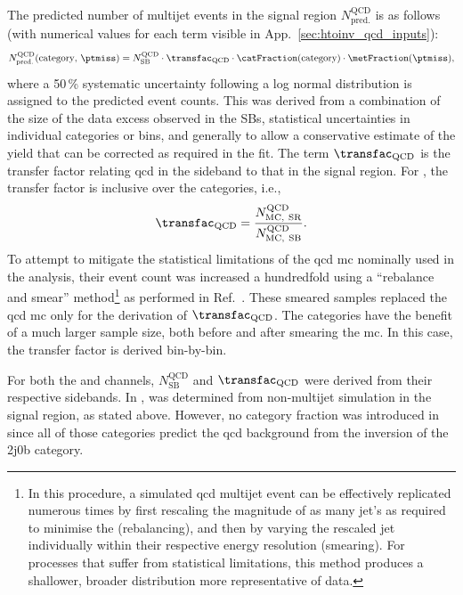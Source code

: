 The predicted number of multijet events in the signal region $N_{\mathrm{pred.}}^{\mathrm{QCD}}$ is as follows (with numerical values for each term visible in App.~\ref{sec:htoinv_qcd_inputs}):
\begin{equation}
    N_{\mathrm{pred.}}^{\mathrm{QCD}}(\text{category}, \, \ptmiss) = N_{\mathrm{SB}}^{\mathrm{QCD}} \cdot \transfac_{\mathrm{QCD}} \cdot \catFraction(\text{category}) \cdot \metFraction(\ptmiss),
    \label{eq:qcd_prediction}
\end{equation}
where a 50\,\% systematic uncertainty following a log normal distribution is assigned to the predicted event counts. This was derived from a combination of the size of the data excess observed in the \glspl{SB}, statistical uncertainties in individual categories or \ptmiss bins, and generally to allow a conservative estimate of the yield that can be corrected as required in the fit. The term $\transfac_{\mathrm{QCD}}$ is the transfer factor relating \acrshort{qcd} in the sideband to that in the signal region. For \ttH, the transfer factor is inclusive over the categories, i.e.,
\begin{equation}
    \transfac_{\mathrm{QCD}} = \frac{ N_{\mathrm{MC, \ SR}}^{\mathrm{QCD}} } { N_{\mathrm{MC, \ SB}}^{\mathrm{QCD}} }.
    \label{eq:transfer_factor_qcd}
\end{equation}
To attempt to mitigate the statistical limitations of the \acrshort{qcd} \acrshort{mc} nominally used in the analysis, their event count was increased a hundredfold using a ``rebalance and smear'' method\footnote{In this procedure, a simulated \acrshort{qcd} multijet event can be effectively replicated numerous times by first rescaling the magnitude of as many \gls{jet}'s \ptvec as required to minimise the \mht (rebalancing), and then by varying the rescaled \gls{jet} \pt individually within their respective energy resolution (smearing). For processes that suffer from statistical limitations, this method produces a shallower, broader \ptmiss distribution more representative of data.} as performed in Ref.~. These smeared samples replaced the \acrshort{qcd} \acrshort{mc} only for the derivation of $\transfac_{\mathrm{QCD}}$. The \VH categories have the benefit of a much larger sample size, both before and after smearing the \acrshort{mc}. In this case, the transfer factor is derived bin-by-bin.

For both the \ttH and \VH channels, $N_{\mathrm{SB}}^{\mathrm{QCD}}$ and $\transfac_{\mathrm{QCD}}$ were derived from their respective sidebands. In \ttH, \catFraction was determined from non-multijet simulation in the signal region, as stated above. However, no category fraction was introduced in \VH since all of those categories predict the \acrshort{qcd} background from the inversion of the 2j0b category.

